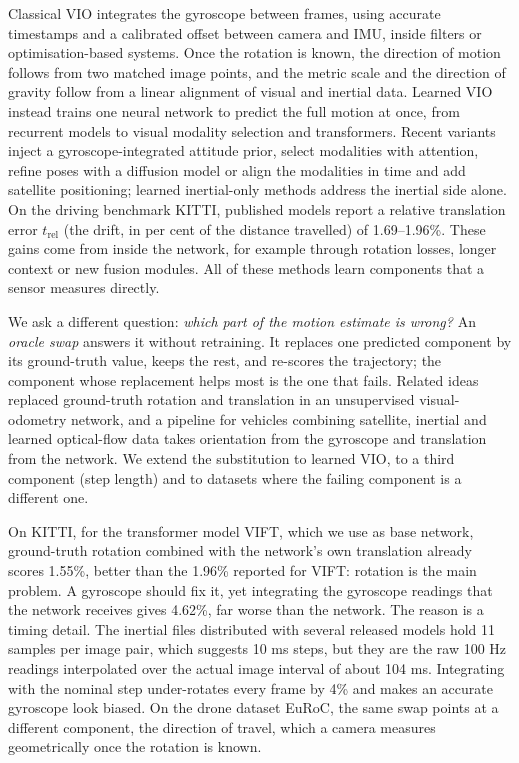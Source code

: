 \documentclass[pdflatex,sn-nature]{sn-jnl}
\begin{document}
Classical VIO integrates the gyroscope between frames, using accurate timestamps and a calibrated offset between camera and IMU, inside filters\cite{Mourikis2007} or optimisation-based systems\cite{Leutenegger2015,Qin2018,Campos2021,Furgale2013,Qin2018b}. Once the rotation is known, the direction of motion follows from two matched image points\cite{Kneip2011,Troiani2014}, and the metric scale and the direction of gravity follow from a linear alignment of visual and inertial data\cite{Martinelli2014,Qin2017}. Learned VIO instead trains one neural network to predict the full motion at once, from recurrent models\cite{Clark2017,Han2019,Almalioglu2022} to visual modality selection\cite{Yang2022} and transformers\cite{Kurt2024}. Recent variants inject a gyroscope-integrated attitude prior\cite{Wan2026}, select modalities with attention\cite{Ma2026}, refine poses with a diffusion model\cite{Qin2026} or align the modalities in time and add satellite positioning\cite{DAPPose}; learned inertial-only methods address the inertial side alone\cite{Liu2020,Herath2020,Brossard2020}. On the driving benchmark KITTI\cite{Geiger2012}, published models report a relative translation error $t_\mathrm{rel}$ (the drift, in per cent of the distance travelled) of 1.69--1.96\%\cite{Kurt2024,Ma2026,Wan2026}. These gains come from inside the network, for example through rotation losses\cite{Chen2022}, longer context or new fusion modules. All of these methods learn components that a sensor measures directly.

We ask a different question: \emph{which part of the motion estimate is wrong?} An \emph{oracle swap} answers it without retraining. It replaces one predicted component by its ground-truth value, keeps the rest, and re-scores the trajectory; the component whose replacement helps most is the one that fails. Related ideas replaced ground-truth rotation and translation in an unsupervised visual-odometry network\cite{Cimarelli2022}, and a pipeline for vehicles combining satellite, inertial and learned optical-flow data takes orientation from the gyroscope and translation from the network\cite{Kang2025}. We extend the substitution to learned VIO, to a third component (step length) and to datasets where the failing component is a different one.

On KITTI, for the transformer model VIFT\cite{Kurt2024}, which we use as base network, ground-truth rotation combined with the network's own translation already scores 1.55\%, better than the 1.96\% reported for VIFT: rotation is the main problem. A gyroscope should fix it, yet integrating the gyroscope readings that the network receives gives 4.62\%, far worse than the network. The reason is a timing detail. The inertial files distributed with several released models\cite{Yang2022,Kurt2024,Chen2023NASVIO,Park2024ULVIO} hold 11 samples per image pair, which suggests 10 ms steps, but they are the raw 100 Hz readings interpolated over the actual image interval of about 104 ms. Integrating with the nominal step under-rotates every frame by 4\% and makes an accurate gyroscope look biased. On the drone dataset EuRoC\cite{Burri2016}, the same swap points at a different component, the direction of travel, which a camera measures geometrically once the rotation is known.
\end{document}
